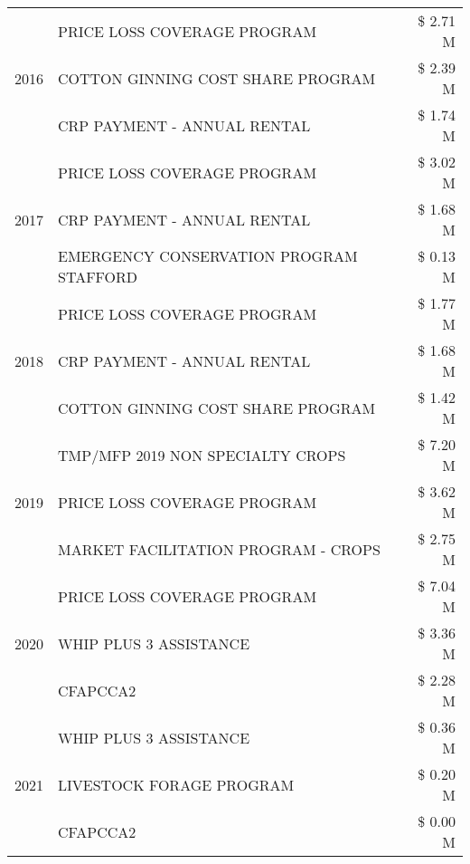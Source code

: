 \begin{tabular}{llr}
\cline{1-3}
\multirow[t]{3}{*}{2016} & PRICE LOSS COVERAGE PROGRAM & \$ 2.71 M \\
 & COTTON GINNING COST SHARE PROGRAM & \$ 2.39 M \\
 & CRP PAYMENT - ANNUAL RENTAL & \$ 1.74 M \\
\cline{1-3}
\multirow[t]{3}{*}{2017} & PRICE LOSS COVERAGE PROGRAM & \$ 3.02 M \\
 & CRP PAYMENT - ANNUAL RENTAL & \$ 1.68 M \\
 & EMERGENCY CONSERVATION PROGRAM STAFFORD & \$ 0.13 M \\
\cline{1-3}
\multirow[t]{3}{*}{2018} & PRICE LOSS COVERAGE PROGRAM & \$ 1.77 M \\
 & CRP PAYMENT - ANNUAL RENTAL & \$ 1.68 M \\
 & COTTON GINNING COST SHARE PROGRAM & \$ 1.42 M \\
\cline{1-3}
\multirow[t]{3}{*}{2019} & TMP/MFP 2019 NON SPECIALTY CROPS & \$ 7.20 M \\
 & PRICE LOSS COVERAGE PROGRAM & \$ 3.62 M \\
 & MARKET FACILITATION PROGRAM - CROPS & \$ 2.75 M \\
\cline{1-3}
\multirow[t]{3}{*}{2020} & PRICE LOSS COVERAGE PROGRAM & \$ 7.04 M \\
 & WHIP PLUS 3 ASSISTANCE & \$ 3.36 M \\
 & CFAPCCA2 & \$ 2.28 M \\
\cline{1-3}
\multirow[t]{3}{*}{2021} & WHIP PLUS 3 ASSISTANCE & \$ 0.36 M \\
 & LIVESTOCK FORAGE PROGRAM & \$ 0.20 M \\
 & CFAPCCA2 & \$ 0.00 M \\
\cline{1-3}
\bottomrule
\end{tabular}
